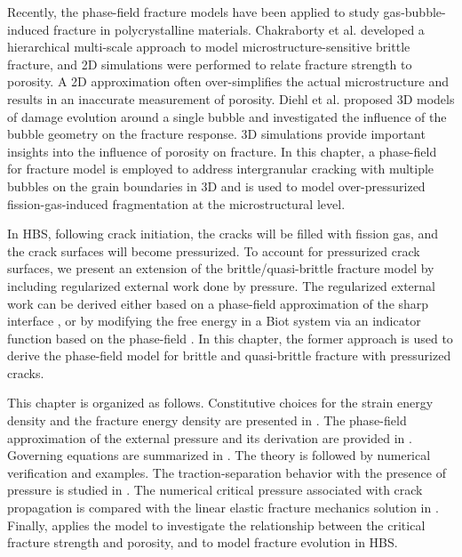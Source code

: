Recently, the phase-field fracture models have been applied to study gas-bubble-induced fracture in polycrystalline materials. Chakraborty et al. \cite{pritam_2016} developed a hierarchical multi-scale approach to model microstructure-sensitive brittle fracture, and 2D simulations were performed to relate fracture strength to porosity. A 2D approximation often over-simplifies the actual microstructure and results in an inaccurate measurement of porosity. Diehl et al. \cite{Diehl2017} proposed 3D models of damage evolution around a single bubble and investigated the influence of the bubble geometry on the fracture response. 3D simulations provide important insights into the influence of porosity on fracture. In this chapter, a phase-field for fracture model is employed to address intergranular cracking with multiple bubbles on the grain boundaries in 3D and is used to model over-pressurized fission-gas-induced fragmentation at the microstructural level.

In HBS, following crack initiation, the cracks will be filled with fission gas, and the crack surfaces will become pressurized. To account for pressurized crack surfaces, we present an extension of the brittle/quasi-brittle fracture model by including regularized external work done by pressure. The regularized external work can be derived either based on a phase-field approximation of the sharp interface \cite{CHUKWUDOZIE2019957}, or by modifying the free energy in a Biot system via an indicator function based on the phase-field \cite{Mikeli__2015}. In this chapter, the former approach is used to derive the phase-field model for brittle and quasi-brittle fracture with pressurized cracks.

This chapter is organized as follows. Constitutive choices for the strain energy density and the fracture energy density are presented in .
The phase-field approximation of the external pressure and its derivation are provided in .
Governing equations are summarized in .
The theory is followed by numerical verification and examples.
The traction-separation behavior with the presence of pressure is studied in .
The numerical critical pressure associated with crack propagation is compared with the linear elastic fracture mechanics solution in .
Finally,  applies the model to investigate the relationship between the critical fracture strength and porosity, and to model fracture evolution in HBS.
